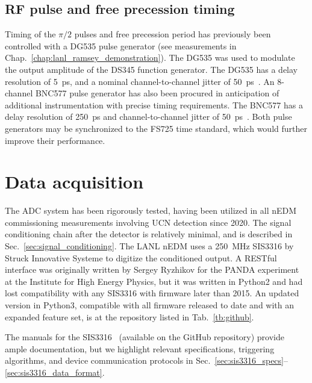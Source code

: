 
\subsection{RF pulse and free precession timing}\label{sec:pulse_gates}


Timing of the $\pi/2$ pulses and free precession period has previously been controlled with a DG535 pulse generator (see measurements in Chap.~\ref{chap:lanl_ramsey_demonstration}). The DG535 was used to modulate the output amplitude of the DS345 function generator. The DG535 has a delay resolution of \qty{5}{ps}, and a nominal channel-to-channel jitter of \qty{50}{ps}~\cite{dg535_manual}. An 8-channel BNC577 pulse generator has also been procured in anticipation of additional instrumentation with precise timing requirements. The BNC577 has a delay resolution of \qty{250}{ps} and channel-to-channel jitter of \qty{50}{ps}~\cite{bnc_577_manual}. Both pulse generators may be synchronized to the FS725 time standard, which would further improve their performance.


\section{Data acquisition}\label{sec:fast_daq}


The ADC system has been rigorously tested, having been utilized in all nEDM commissioning measurements involving UCN detection since 2020. The signal conditioning chain after the detector is relatively minimal, and is described in Sec.~\ref{sec:signal_conditioning}. The LANL nEDM uses a \qty{250}{MHz} SIS3316 by Struck Innovative Systeme to digitize the conditioned output. A RESTful interface was originally written by Sergey Ryzhikov for the PANDA experiment at the Institute for High Energy Physics, but it was written in Python2 and had lost compatibility with any SIS3316 with firmware later than 2015. An updated version in Python3, compatible with all firmware released to date and with an expanded feature set, is at the repository listed in Tab.~\ref{tb:github}. 

The manuals for the SIS3316~\cite{sis3316_manual, sis3316_udp_addendum} (available on the GitHub repository) provide ample documentation, but we highlight relevant specifications, triggering algorithms, and device communication protocols in Sec.~\ref{sec:sis3316_specs}--\ref{sec:sis3316_data_format}.

